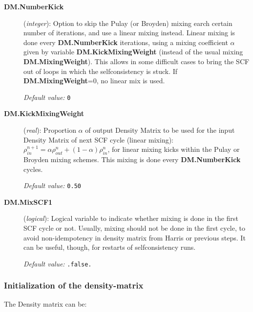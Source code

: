 \documentclass[11pt]{article}
\begin{document}
\begin{description}
\item[{\bf DM.NumberKick}] ({\it integer}):
Option to skip the Pulay (or Broyden) mixing earch certain number of iterations,
and use a linear mixing instead. Linear mixing is done
every {\bf DM.NumberKick} iterations, using a mixing coefficient
$\alpha$ given by variable {\bf DM.KickMixingWeight}
(instead of the usual mixing {\bf DM.MixingWeight}).
This allows in some difficult cases to bring the SCF out of
loops in which the selfconsistency is stuck.
If {\bf DM.MixingWeight}=0, no linear mix is used.

{\it Default value:} {\tt 0}

\item[{\bf DM.KickMixingWeight}] ({\it real}):
Proportion $\alpha$ of
output Density Matrix to be used for the input Density Matrix of
next SCF cycle (linear mixing):
$\rho^{n+1}_{in} = \alpha \rho^{n}_{out}
+(1 - \alpha) \rho^{n}_{in}$, for linear mixing kicks within the
Pulay or Broyden mixing schemes.
This mixing is done every {\bf DM.NumberKick} cycles.

{\it Default value:} {\tt 0.50}


\item[{\bf DM.MixSCF1}] ({\it logical}):
Logical variable to indicate whether mixing is done in the
first SCF cycle or not. Usually, mixing should not be done in
the first cycle, to avoid non-idempotency in density matrix
from Harris or previous steps. It can be useful, though,
for restarts of selfconsistency runs.

{\it Default value:} {\tt .false.}

\end{description}

\subsubsection{Initialization of the density-matrix}

The Density matrix can be:
\end{document}
